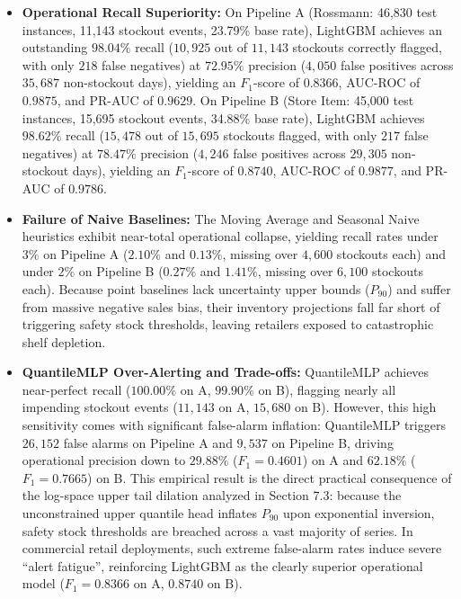 \documentclass[11pt,a4paper]{article}
\begin{document}
\begin{itemize}
    \item \textbf{Operational Recall Superiority:} On Pipeline A (Rossmann: 46,830 test instances, 11,143 stockout events, 23.79\% base rate), LightGBM achieves an outstanding $98.04\%$ recall ($10,925$ out of $11,143$ stockouts correctly flagged, with only $218$ false negatives) at $72.95\%$ precision ($4,050$ false positives across $35,687$ non-stockout days), yielding an $F_1$-score of $0.8366$, AUC-ROC of $0.9875$, and PR-AUC of $0.9629$. On Pipeline B (Store Item: 45,000 test instances, 15,695 stockout events, 34.88\% base rate), LightGBM achieves $98.62\%$ recall ($15,478$ out of $15,695$ stockouts flagged, with only $217$ false negatives) at $78.47\%$ precision ($4,246$ false positives across $29,305$ non-stockout days), yielding an $F_1$-score of $0.8740$, AUC-ROC of $0.9877$, and PR-AUC of $0.9786$.
    \item \textbf{Failure of Naive Baselines:} The Moving Average and Seasonal Naive heuristics exhibit near-total operational collapse, yielding recall rates under $3\%$ on Pipeline A ($2.10\%$ and $0.13\%$, missing over $4,600$ stockouts each) and under $2\%$ on Pipeline B ($0.27\%$ and $1.41\%$, missing over $6,100$ stockouts each). Because point baselines lack uncertainty upper bounds ($P_{90}$) and suffer from massive negative sales bias, their inventory projections fall far short of triggering safety stock thresholds, leaving retailers exposed to catastrophic shelf depletion.
    \item \textbf{QuantileMLP Over-Alerting and Trade-offs:} QuantileMLP achieves near-perfect recall ($100.00\%$ on A, $99.90\%$ on B), flagging nearly all impending stockout events ($11,143$ on A, $15,680$ on B). However, this high sensitivity comes with significant false-alarm inflation: QuantileMLP triggers $26,152$ false alarms on Pipeline A and $9,537$ on Pipeline B, driving operational precision down to $29.88\%$ ($F_1 = 0.4601$) on A and $62.18\%$ ($F_1 = 0.7665$) on B. This empirical result is the direct practical consequence of the log-space upper tail dilation analyzed in Section 7.3: because the unconstrained upper quantile head inflates $P_{90}$ upon exponential inversion, safety stock thresholds are breached across a vast majority of series. In commercial retail deployments, such extreme false-alarm rates induce severe ``alert fatigue'', reinforcing LightGBM as the clearly superior operational model ($F_1 = 0.8366$ on A, $0.8740$ on B).
\end{itemize}
\end{document}
